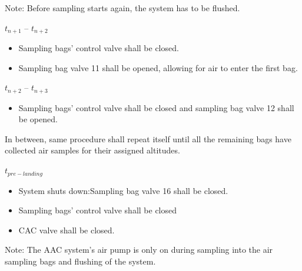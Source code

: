 Note: Before sampling starts again, the system has to be flushed. 

$t_{n+1}$ – $t_{n+2}$
\begin{itemize}
    \item Sampling bags' control valve shall be closed.
    \item Sampling bag valve 11 shall be opened, allowing for air to enter the first bag.
\end{itemize}

$t_{n+2}$ – $t_{n+3}$
\begin{itemize}
    \item Sampling bags' control valve shall be closed and sampling bag valve 12 shall be opened.
\end{itemize}

In between, same procedure shall repeat itself until all the remaining bags have collected air samples for their assigned altitudes.

$t_{pre-landing}$
\begin{itemize}
    \item System shuts down:Sampling bag valve 16 shall be closed.
    \item Sampling bags' control valve shall be closed
    \item CAC valve shall be closed.
\end{itemize}


Note: The AAC system's air pump is only on during sampling into the air sampling bags and flushing of the system.

\raggedbottom